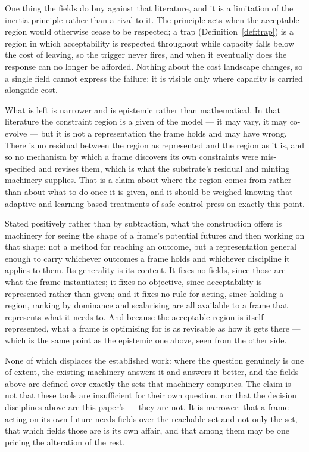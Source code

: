 \documentclass[11pt,a4paper]{article}
\theoremstyle{remark}
\begin{document}
One thing the fields do buy against that literature, and it is a limitation of the inertia principle
rather than a rival to it. The principle acts when the acceptable region would otherwise cease to be
respected; a trap (Definition~\ref{def:trap}) is a region in which acceptability is respected
throughout while capacity falls below the cost of leaving, so the trigger never fires, and when it
eventually does the response can no longer be afforded. Nothing about the cost landscape changes, so
a single field cannot express the failure; it is visible only where capacity is carried alongside
cost.

What is left is narrower and is epistemic rather than mathematical. In that literature the
constraint region is a given of the model --- it may vary, it may co-evolve --- but it is not a
representation the frame holds and may have wrong. There is no residual between the region as
represented and the region as it is, and so no mechanism by which a frame discovers its own
constraints were mis-specified and revises them, which is what the substrate's residual and minting
machinery supplies. That is a claim about where the region comes from rather than about what to do
once it is given, and it should be weighed knowing that adaptive and learning-based treatments of
safe control press on exactly this point.

Stated positively rather than by subtraction, what the construction offers is machinery for seeing
the shape of a frame's potential futures and then working on that shape: not a method for reaching
an outcome, but a representation general enough to carry whichever outcomes a frame holds and
whichever discipline it applies to them. Its generality is its content. It fixes no fields, since
those are what the frame instantiates; it fixes no objective, since acceptability is represented
rather than given; and it fixes no rule for acting, since holding a region, ranking by dominance and
scalarising are all available to a frame that represents what it needs to. And because the
acceptable region is itself represented, what a frame is optimising for is as revisable as how it
gets there --- which is the same point as the epistemic one above, seen from the other side.

None of which displaces the established work: where the question genuinely is one of extent, the
existing machinery answers it and answers it better, and the fields above are defined over exactly
the sets that machinery computes. The claim is not that these tools are insufficient for their own
question, nor that the decision disciplines above are this paper's --- they are not. It is narrower:
that a frame acting on its own future needs fields over the reachable set and not only the set, that
which fields those are is its own affair, and that among them may be one pricing the alteration of
the rest.
\end{document}

